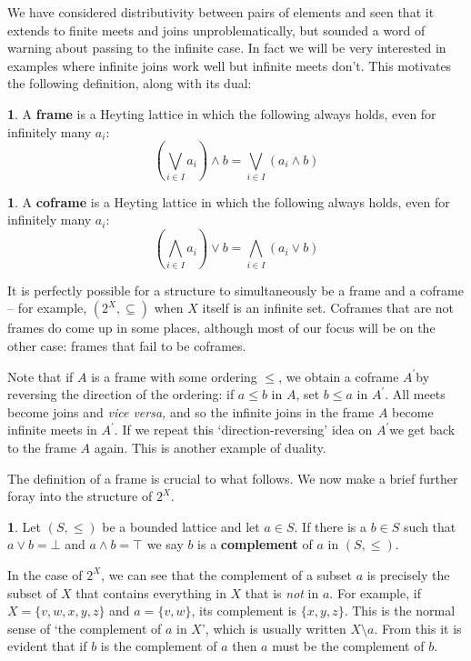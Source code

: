 \documentclass[oneside,english]{amsbook}
\numberwithin{section}{chapter}
\theoremstyle{plain}
\theoremstyle{definition}
\newtheorem{defn}[thm]{\protect\definitionname}
\providecommand{\definitionname}{Definition}
\begin{document}
We have considered distributivity between pairs of elements and seen that it extends to finite meets and joins unproblematically, but sounded a word of warning about passing to the infinite case. In fact we will be very interested in examples where infinite joins work well but infinite meets don't. This motivates the following definition, along with its dual: 

\begin{defn} 
	A \textbf{frame }is a Heyting lattice in which the following always holds, even for infinitely many $a_{i}$:
		\[ (\bigvee_{i\in I}a_{i})\land b=\bigvee_{i\in I}(a_{i}\land b) \]
\end{defn}

\begin{defn} 
	A \textbf{coframe }is a Heyting lattice in which the following always holds, even for infinitely many $a_{i}$: 
		\[ (\bigwedge_{i\in I}a_{i})\lor b=\bigwedge_{i\in I}(a_{i}\lor b) \]
\end{defn} 

It is perfectly possible for a structure to simultaneously be a frame and a coframe -- for example, $(2^{X},\subseteq)$ when $X$ itself is an infinite set. Coframes that are not frames do come up in some places, although most of our focus will be on the other case: frames that fail to be coframes.

Note that if $A$ is a frame with some ordering $\le$, we obtain a coframe $A^{\prime}$by reversing the direction of the ordering: if $a\le b$ in $A$, set $b\le a$ in $A^{\prime}.$ All meets become joins and \emph{vice versa, }and so the infinite joins in the frame $A$ become infinite meets in $A^{\prime}$. If we repeat this `direction-reversing' idea on $A^{\prime}$we get back to the frame $A$ again. This is another example of duality.

The definition of a frame is crucial to what follows. We now make a brief further foray into the structure of $2^{X}$. 

\begin{defn} 
	Let $(S,\le)$ be a bounded lattice and let $a\in S$. If there is a $b\in S$ such that $a\lor b=\bot$ and $a\land b=\top$ we say $b$ is a \textbf{complement} of $a$ in $(S,\le)$. 
\end{defn} 

In the case of $2^{X}$, we can see that the complement of a subset $a$ is precisely the subset of $X$ that contains everything in $X$ that is \emph{not} in $a$. For example, if $X=\{v,w,x,y,z\}$ and $a=\{v,w\}$, its complement is $\{x,y,z\}$. This is the normal sense of `the complement of $a$ in $X$', which is usually written $X\setminus a$. From this it is evident that if $b$ is the complement of $a$ then $a$ must be the complement of $b$.
\end{document}
